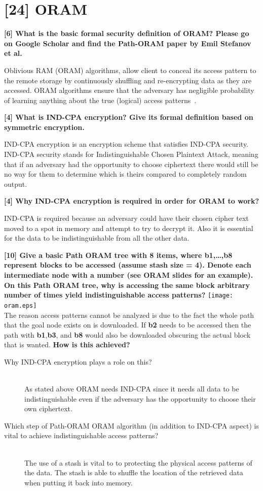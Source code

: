\documentclass[letterpaper,11pt,notitlepage,fleqn]{article}
\begin{document}
\section{[24] ORAM}

\noindent \textbf{[6] What is the basic formal security definition of ORAM? Please go on Google Scholar and find the Path-ORAM paper by Emil Stefanov et al.} 

Oblivious RAM (ORAM) algorithms, allow client to conceal its access pattern to the remote storage by continuously shuffling and re-encrypting data as they are accessed. ORAM algorithms ensure that the adversary has negligible probability of learning anything about the true (logical) access patterns~\cite{Stef}.  


\noindent \textbf{[4] What is IND-CPA encryption? Give its formal definition based on symmetric encryption.}

IND-CPA encryption is an encryption scheme that satisfies IND-CPA security. IND-CPA security stands for Indistinguishable Chosen Plaintext Attack, meaning that if an adversary had the opportunity to choose ciphertext there would still be no way for them to determine which is theirs compared to completely random output. 

\noindent \textbf{[4] Why IND-CPA encryption is required in order for ORAM to work?}

IND-CPA is required because an adversary could have their chosen cipher text moved to a spot in memory and attempt to try to decrypt it. Also it is essential for the data to be indistinguishable from all the other data. 

\noindent \textbf{[10] Give a basic Path ORAM tree with 8 items, where b1,…,b8 represent blocks to be accessed (assume stash size = 4). Denote each intermediate node with a number (see ORAM slides for an example). On this Path ORAM tree, why is accessing the same block arbitrary number of times yield indistinguishable access patterns?} 
\texttt{[image: oram.eps]}\\
\indent The reason access patterns cannot be analyzed is due to the fact the whole path that the goal node exists on is downloaded. If \textbf{b2} needs to be accessed then the path with \textbf{b1},\textbf{b3}, and \textbf{b8} would also be downloaded obscuring the actual block that is wanted. 
\noindent \textbf{How is this achieved?}
\begin{description}
    \item [Why IND-CPA encryption plays a role on this?] \hfill \\
        As stated above ORAM needs IND-CPA since it needs all data to be indistinguishable even if the adversary has the opportunity to choose their own ciphertext. 
    \item [Which  step  of  Path-ORAM  ORAM  algorithm  (in  addition  to  IND-CPA aspect) is vital to achieve indistinguishable access patterns?] \hfill \\
        The use of a stash is vital to to protecting the physical access patterns of the data. The stash is able to shuffle the location of the retrieved data when putting it back into memory. 
\end{description}

\medskip


\end{document}
